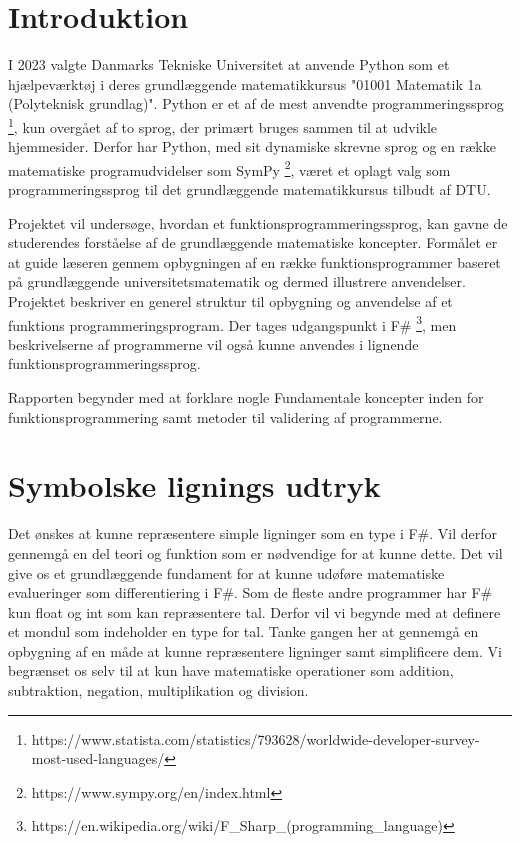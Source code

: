 \documentclass{article}
\begin{document}

\tableofcontents
\newpage
\section{Introduktion}


I 2023 valgte Danmarks Tekniske Universitet at anvende Python som et hjælpeværktøj i deres grundlæggende matematikkursus "01001 Matematik 1a (Polyteknisk grundlag)". Python er et af de mest anvendte programmeringssprog \footnote{https://www.statista.com/statistics/793628/worldwide-developer-survey-most-used-languages/}, kun overgået af to sprog, der primært bruges sammen til at udvikle hjemmesider. Derfor har Python, med sit dynamiske skrevne sprog og en række matematiske programudvidelser som SymPy \footnote{https://www.sympy.org/en/index.html}, været et oplagt valg som programmeringssprog til det grundlæggende matematikkursus tilbudt af DTU.

Projektet vil undersøge, hvordan et funktionsprogrammeringssprog, kan gavne de studerendes forståelse af de grundlæggende matematiske koncepter. Formålet er at guide læseren gennem opbygningen af en række funktionsprogrammer baseret på grundlæggende universitetsmatematik og dermed illustrere anvendelser. Projektet beskriver en generel struktur til opbygning og anvendelse af et funktions programmeringsprogram. Der tages udgangspunkt i F\# \footnote{https://en.wikipedia.org/wiki/F\_Sharp\_(programming\_language)}, men beskrivelserne af programmerne vil også kunne anvendes i lignende funktionsprogrammeringssprog.

Rapporten begynder med at forklare nogle Fundamentale koncepter inden for funktionsprogrammering samt metoder til validering af programmerne. 



\section{Symbolske lignings udtryk}
Det ønskes at kunne repræsentere simple ligninger som en type i F\#. Vil derfor gennemgå en del teori og funktion som er nødvendige for at kunne dette. Det vil give os et grundlæggende fundament for at kunne udøføre matematiske evalueringer som differentiering i F\#. Som de fleste andre programmer har F\# kun float og int som kan repræsentere tal. Derfor vil vi begynde med at definere et mondul som indeholder en type for tal. Tanke gangen her at gennemgå en opbygning af en måde at kunne repræsentere ligninger samt simplificere dem. Vi begrænset os selv til at kun have matematiske operationer som addition, subtraktion, negation, multiplikation og division.
\end{document}
